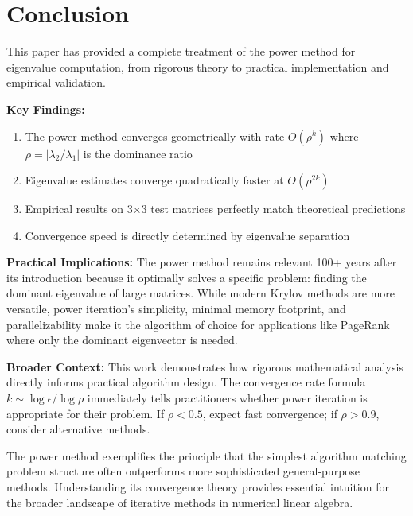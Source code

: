\documentclass[11pt,twocolumn]{article}
\begin{document}
\section{Conclusion}

This paper has provided a complete treatment of the power method for eigenvalue computation, from rigorous theory to practical implementation and empirical validation.

\textbf{Key Findings:}
\begin{enumerate}
\item The power method converges geometrically with rate $O(\rho^k)$ where $\rho = |\lambda_2/\lambda_1|$ is the dominance ratio
\item Eigenvalue estimates converge quadratically faster at $O(\rho^{2k})$
\item Empirical results on 3×3 test matrices perfectly match theoretical predictions
\item Convergence speed is directly determined by eigenvalue separation
\end{enumerate}

\textbf{Practical Implications:}
The power method remains relevant 100+ years after its introduction because it optimally solves a specific problem: finding the dominant eigenvalue of large matrices. While modern Krylov methods are more versatile, power iteration's simplicity, minimal memory footprint, and parallelizability make it the algorithm of choice for applications like PageRank where only the dominant eigenvector is needed.

\textbf{Broader Context:}
This work demonstrates how rigorous mathematical analysis directly informs practical algorithm design. The convergence rate formula $k \sim \log \epsilon / \log \rho$ immediately tells practitioners whether power iteration is appropriate for their problem. If $\rho < 0.5$, expect fast convergence; if $\rho > 0.9$, consider alternative methods.

The power method exemplifies the principle that the simplest algorithm matching problem structure often outperforms more sophisticated general-purpose methods. Understanding its convergence theory provides essential intuition for the broader landscape of iterative methods in numerical linear algebra.
\end{document}
